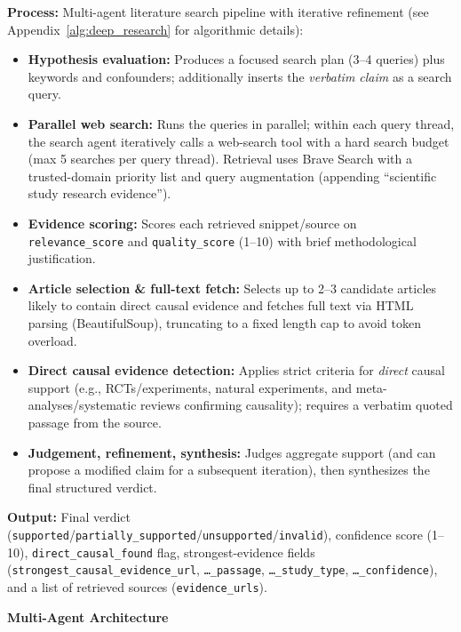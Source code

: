 \textbf{Process:} Multi-agent literature search pipeline with iterative refinement (see Appendix~\ref{alg:deep_research} for algorithmic details):
\begin{itemize}[noitemsep]
    \item \textbf{Hypothesis evaluation:} Produces a focused search plan (3--4 queries) plus keywords and confounders; additionally inserts the \emph{verbatim claim} as a search query.
    \item \textbf{Parallel web search:} Runs the queries in parallel; within each query thread, the search agent iteratively calls a web-search tool with a hard search budget (max 5 searches per query thread). Retrieval uses Brave Search with a trusted-domain priority list and query augmentation (appending ``scientific study research evidence'').
    \item \textbf{Evidence scoring:} Scores each retrieved snippet/source on \texttt{relevance\_score} and \texttt{quality\_score} (1--10) with brief methodological justification.
    \item \textbf{Article selection \& full-text fetch:} Selects up to 2--3 candidate articles likely to contain direct causal evidence and fetches full text via HTML parsing (BeautifulSoup), truncating to a fixed length cap to avoid token overload.
    \item \textbf{Direct causal evidence detection:} Applies strict criteria for \emph{direct} causal support (e.g., RCTs/experiments, natural experiments, and meta-analyses/systematic reviews confirming causality); requires a verbatim quoted passage from the source.
    \item \textbf{Judgement, refinement, synthesis:} Judges aggregate support (and can propose a modified claim for a subsequent iteration), then synthesizes the final structured verdict.
\end{itemize}

\begin{sloppypar}
\textbf{Output:} Final verdict (\texttt{supported}/\texttt{partially\_supported}/\texttt{unsupported}/\texttt{invalid}), confidence score (1--10), {\small\texttt{direct\_causal\_found}} flag, strongest-evidence fields ({\small\texttt{strongest\_causal\_evidence\_url}, \texttt{\dots\_passage}, \texttt{\dots\_study\_type}, \texttt{\dots\_confidence}}), and a list of retrieved sources (\texttt{evidence\_urls}).
\end{sloppypar}

\noindent\textbf{Multi-Agent Architecture}

